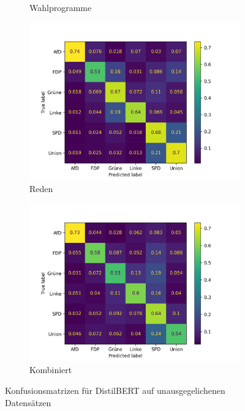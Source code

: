\begin{figure}[H]
\begin{subfigure}{0.49\textwidth}
        \caption{Wahlprogramme} \label{sfig:confusionMatrixBertManifestUnbalanced}
    \end{subfigure}
    \hfill
    \begin{subfigure}{0.49\textwidth}
        \includegraphics[width=\textwidth]{data/images/modeling/bert/none/speeches_confusion_matrix.png}
        \caption{Reden} \label{sfig:confusionMatrixBertSpeechesUnbalanced}
    \end{subfigure}
    \hfill
    \begin{subfigure}{0.49\textwidth}
        \includegraphics[width=\textwidth]{data/images/modeling/bert/none/all_confusion_matrix.png}
        \caption{Kombiniert} \label{sfig:confusionMatrixBertAllUnbalanced}
    \end{subfigure}
    \caption{Konfusionsmatrizen für DistilBERT auf unausgegelichenen Datensätzen} \label{fig:confusionMatrixDistilbertUnbalanced}
\end{figure}
